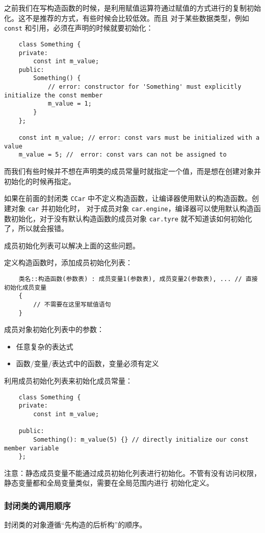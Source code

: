 \documentclass[UTF8]{ctexart}
\begin{document}
之前我们在写构造函数的时候，是利用赋值运算符通过赋值的方式进行的复制初始化。这不是推荐的方式，有些时候会比较低效。而且
对于某些数据类型，例如 \texttt{const} 和引用，必须在声明的时候就要初始化：
\begin{verbatim}
    class Something {
    private:
        const int m_value;
    public:
        Something() {
            // error: constructor for 'Something' must explicitly initialize the const member
            m_value = 1;
        }
    };

    const int m_value; // error: const vars must be initialized with a value
    m_value = 5; //  error: const vars can not be assigned to
\end{verbatim}

而我们有些时候并不想在声明类的成员常量时就指定一个值，而是想在创建对象并初始化的时候再指定。

如果在前面的封闭类 \texttt{CCar} 中不定义构造函数，让编译器使用默认的构造函数。创建对象 \texttt{car} 并初始化时，
对于成员对象 \texttt{car.engine}，编译器可以使用默认构造函数初始化，对于没有默认构造函数的成员对象
\texttt{car.tyre} 就不知道该如何初始化了，所以就会报错。

成员初始化列表可以解决上面的这些问题。

定义构造函数时，添加成员初始化列表：
\begin{verbatim}
    类名::构造函数(参数表) : 成员变量1(参数表), 成员变量2(参数表), ... // 直接初始化成员变量
    {
        // 不需要在这里写赋值语句
    }
\end{verbatim}

成员对象初始化列表中的参数：
\begin{itemize}
    \item 任意复杂的表达式
    \item 函数/变量/表达式中的函数，变量必须有定义
\end{itemize}

利用成员初始化列表来初始化成员常量：
\begin{verbatim}
    class Something {
    private:
        const int m_value;

    public:
        Something(): m_value(5) {} // directly initialize our const member variable
    };
\end{verbatim}

注意：静态成员变量不能通过成员初始化列表进行初始化。不管有没有访问权限，静态变量都和全局变量类似，需要在全局范围内进行
初始化定义。

\subsubsection{封闭类的调用顺序}
封闭类的对象遵循“先构造的后析构”的顺序。
\end{document}
